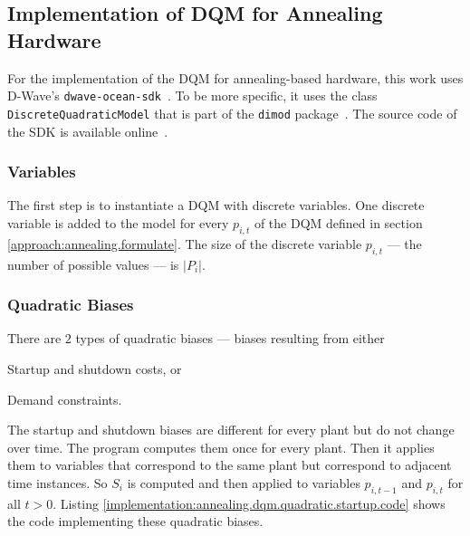 \subsection{Implementation of DQM for Annealing Hardware}
\label{implementation:annealing.dqm}

For the implementation of the DQM for annealing-based hardware, this work uses D-Wave's \texttt{dwave-ocean-sdk}~\cite{OceanSDKDoc}.
To be more specific, it uses the class \texttt{DiscreteQuadraticModel} that is part of the \texttt{dimod} package~\cite{DQMDoc}.
The source code of the SDK is available online~\cite{OceanSDKGit}.

\subsubsection{Variables}

The first step is to instantiate a DQM with discrete variables.
One discrete variable is added to the model for every $p_{i, t}$ of the DQM defined in section \ref{approach:annealing.formulate}.
The size of the discrete variable $p_{i, t}$ --- the number of possible values --- is $| P_i |$.

\subsubsection{Quadratic Biases}
\label{implementation:annealing.dqm.quadratic}

There are $2$ types of quadratic biases --- biases resulting from either
\begin{enumerate*}[label=(\roman*)]
  \item Startup and shutdown costs, or
  \item Demand constraints.
\end{enumerate*}

The startup and shutdown biases are different for every plant but do not change over time.
The program computes them once for every plant.
Then it applies them to variables that correspond to the same plant but correspond to adjacent time instances.
So $S_i$ is computed and then applied to variables $p_{i, t-1}$ and $p_{i, t}$ for all $t > 0$.
Listing \ref{implementation:annealing.dqm.quadratic.startup.code} shows the code implementing these quadratic biases.

